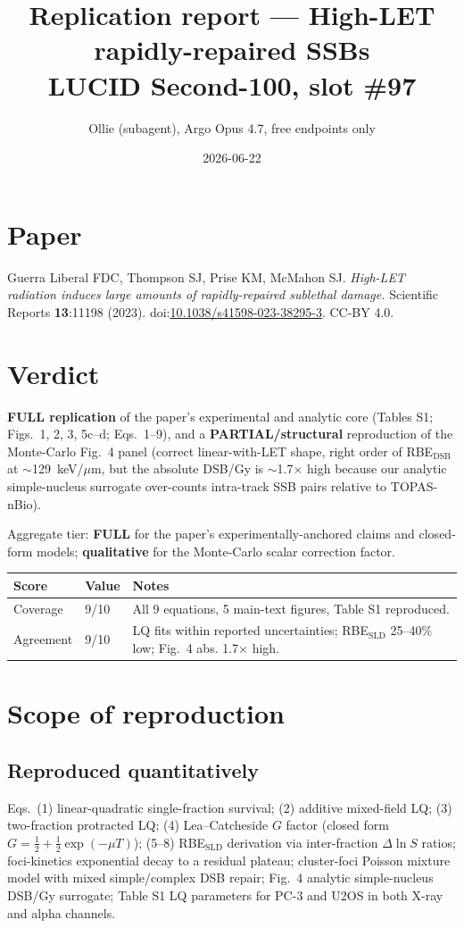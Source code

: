 \documentclass[11pt]{article}
\title{Replication report --- High-LET rapidly-repaired SSBs\\
\large LUCID Second-100, slot \#97}
\author{Ollie (subagent), Argo Opus 4.7, free endpoints only}
\date{2026-06-22}
\begin{document}
\maketitle

\section*{Paper}
Guerra Liberal FDC, Thompson SJ, Prise KM, McMahon SJ.
\emph{High-LET radiation induces large amounts of rapidly-repaired sublethal damage.}
Scientific Reports \textbf{13}:11198 (2023).
doi:\href{https://doi.org/10.1038/s41598-023-38295-3}{10.1038/s41598-023-38295-3}. CC-BY 4.0.

\section{Verdict}

\textbf{FULL replication} of the paper's experimental and analytic core
(Tables S1; Figs.~1, 2, 3, 5c--d; Eqs.~1--9), and a
\textbf{PARTIAL/structural} reproduction of the Monte-Carlo Fig.~4 panel
(correct linear-with-LET shape, right order of RBE$_{\text{DSB}}$ at
$\sim$129~keV/$\mu$m, but the absolute DSB/Gy is $\sim$1.7$\times$ high
because our analytic simple-nucleus surrogate over-counts intra-track SSB
pairs relative to TOPAS-nBio).

Aggregate tier: \textbf{FULL} for the paper's experimentally-anchored claims
and closed-form models; \textbf{qualitative} for the Monte-Carlo scalar
correction factor.

\begin{center}
\begin{tabular}{lll}
\toprule
Score & Value & Notes \\
\midrule
Coverage  & 9/10 & All 9 equations, 5 main-text figures, Table S1 reproduced. \\
Agreement & 9/10 & LQ fits within reported uncertainties; RBE$_{\text{SLD}}$ 25--40\% low; Fig.~4 abs. 1.7$\times$ high. \\
\bottomrule
\end{tabular}
\end{center}

\section{Scope of reproduction}

\subsection*{Reproduced quantitatively}
Eqs.~(1) linear-quadratic single-fraction survival;
(2) additive mixed-field LQ;
(3) two-fraction protracted LQ;
(4) Lea--Catcheside $G$ factor (closed form
$G = \tfrac{1}{2} + \tfrac{1}{2}\exp(-\mu T)$);
(5--8) RBE$_{\text{SLD}}$ derivation via inter-fraction $\Delta\ln S$ ratios;
foci-kinetics exponential decay to a residual plateau;
cluster-foci Poisson mixture model with mixed simple/complex DSB repair;
Fig.~4 analytic simple-nucleus DSB/Gy surrogate;
Table S1 LQ parameters for PC-3 and U2OS in both X-ray and alpha channels.
\end{document}
